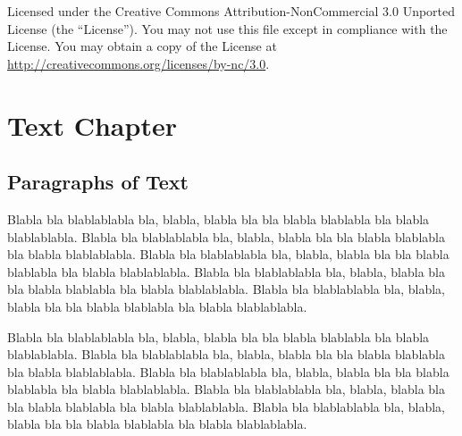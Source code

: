 \documentclass{udc-book}
\begin{document}

\newpage
{}%
{Licensed under the Creative Commons Attribution-NonCommercial 3.0 Unported License (the ``License''). You may not use this file except in compliance with the License. You may obtain a copy of the License at \url{http://creativecommons.org/licenses/by-nc/3.0}.}


\pagestyle{empty} %
\tableofcontents %
\cleardoublepage
\pagestyle{fancy} %



\chapter{Text Chapter}

\section{Paragraphs of Text}

Blabla bla blablablabla bla, blabla, blabla bla bla blabla blablabla bla blabla
blablablabla.  Blabla bla blablablabla bla, blabla, blabla bla bla blabla
blablabla bla blabla blablablabla.  Blabla bla blablablabla bla, blabla, blabla
bla bla blabla blablabla bla blabla blablablabla.  Blabla bla blablablabla bla,
blabla, blabla bla bla blabla blablabla bla blabla blablablabla.  Blabla bla
blablablabla bla, blabla, blabla bla bla blabla blablabla bla blabla
blablablabla.

Blabla bla blablablabla bla, blabla, blabla bla bla blabla blablabla bla blabla
blablablabla.  Blabla bla blablablabla bla, blabla, blabla bla bla blabla
blablabla bla blabla blablablabla.  Blabla bla blablablabla bla, blabla, blabla
bla bla blabla blablabla bla blabla blablablabla.  Blabla bla blablablabla bla,
blabla, blabla bla bla blabla blablabla bla blabla blablablabla.  Blabla bla
blablablabla bla, blabla, blabla bla bla blabla blablabla bla blabla
blablablabla.
\end{document}
